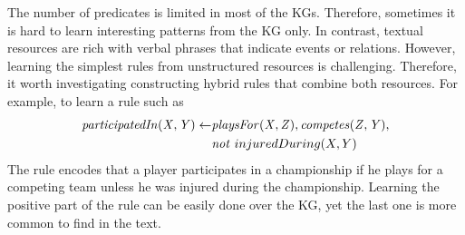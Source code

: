  The number of predicates is limited in most of the KGs. Therefore, sometimes it is hard to learn interesting patterns from the KG only. In contrast, textual resources are rich with verbal phrases that indicate events or relations. However, learning the simplest rules from unstructured resources is challenging. Therefore, it worth investigating constructing hybrid rules that combine both resources.  For example, to learn a rule such as
\vspace{-0.9em}
\begin{align*}
\mathit{participatedIn(X,Y)} \leftarrow & \mathit{playsFor(X,Z)}, \mathit{competes(Z,Y)},\\ & \mathit{not}~ injuredDuring(X,Y)
\end{align*}
The rule encodes that a player participates in a championship if he plays for a competing team unless he was injured during the championship. Learning the positive part of the rule can be easily done over the KG, yet the last one is more common to find in the text. 





